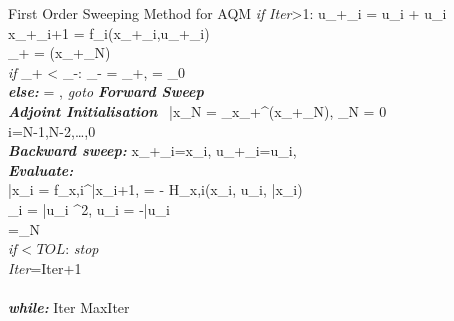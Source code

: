 \documentclass[12pt]{article}
\begin{document}
\begin{pseudocode}[ruled]{ }{First \hspace{1mm} Order \hspace{1mm} Sweeping \hspace{1mm}Method \hspace{1mm} for \hspace{1mm} AQM\hspace{1mm}  }
\hspace{10mm} \textit{if} \hspace{5mm}\textit{Iter}>1: \hspace{2mm} {u_{+}}_{i} = u_{i} +  \bigtriangleup \delta u_{i}\\
		\hspace{10mm} {x_{+}}_{i+1} = f_{i}({x_{+}}_{i},{u_{+}}_{i})\\
_{+} = \phi({x_{+}}_{N})\\
	\textit{if} \hspace{4mm}  _{+} < _{-}:\hspace{2mm}  _{-} = _{+}, \hspace{2mm}\bigtriangleup = \bigtriangleup_{0}\\
\textit{\bf{else:}}\hspace{2mm} \bigtriangleup = \frac{\bigtriangleup}{\rho},\hspace{2mm} \textit{goto {\bf Forward Sweep}}\\
   \textit{\bf{Adjoint Initialisation}}  \hspace{2mm}  \ \bar{x}_{N} = \phi_{x_+}^\top ({x_{+}}_{N}), \gamma_{N} = 0\\
\FOR i=N-1,N-2,\dots,0\\
  \hspace{1mm}\textit{\bf{Backward sweep:}}  \hspace{2mm} {x_{+}}_{i}=x_{i}, \hspace{1mm} {u_{+}}_{i}=u_{i},\hspace{1mm} \\
	\hspace{10mm} \textit{\bf{Evaluate:}}  \\
	\hspace{15mm} \bar{x}_{i} = f_{x,i}^\top \bar{x}_{i+1}, = - H_{x,i}(x_{i}, u_{i}, \bar{x}_{i})\\%
	\hspace{15mm} \gamma_{i} =  \parallel \bar{u}_{i} \parallel^{2}, \hspace{1mm} \delta u_{i} = -{\bar{u}_{i}}\\
	\hspace{10mm} \gamma={\gamma}_{N} \\

\textit{if} \hspace{5mm}\parallel \gamma \parallel< $TOL$:\hspace{1mm} \textit{stop}\\
\textit{Iter}=Iter+1\\
\END\\

\textit{\bf{while}:} \hspace{2mm} Iter \leq MaxIter 
\end{pseudocode}
\end{document}
